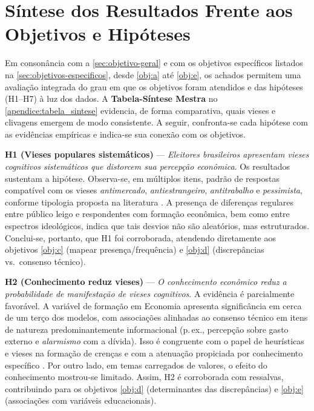\section{Síntese dos Resultados Frente aos Objetivos e Hipóteses}\label{sec:sintese-resultados}

Em consonância com a \autoref{sec:objetivo-geral} e com os objetivos específicos listados na \autoref{sec:objetivos-especificos}, desde \autoref{obj:a} até \autoref{obj:e}, os achados permitem uma avaliação integrada do grau em que os objetivos foram atendidos e das hipóteses (H1–H7) à luz dos dados. A \textbf{Tabela-Síntese Mestra} no \autoref{apendice:tabela_sintese} evidencia, de forma comparativa, quais vieses e clivagens emergem de modo consistente. A seguir, confronta-se cada hipótese com as evidências empíricas e indica-se sua conexão com os objetivos.

\textbf{H1 (Vieses populares sistemáticos)} — \textit{Eleitores brasileiros apresentam vieses cognitivos sistemáticos que distorcem sua percepção econômica}. Os resultados sustentam a hipótese. Observa-se, em múltiplos itens, padrão de respostas compatível com os vieses \emph{antimercado}, \emph{antiestrangeiro}, \emph{antitrabalho} e \emph{pessimista}, conforme tipologia proposta na literatura \cite{The_Myth_of_the_Rational_Voter}. A presença de diferenças regulares entre público leigo e respondentes com formação econômica, bem como entre espectros ideológicos, indica que tais desvios não são aleatórios, mas estruturados. Conclui-se, portanto, que H1 foi corroborada, atendendo diretamente aos objetivos \autoref{obj:c} (mapear presença/frequência) e \autoref{obj:d} (discrepâncias vs.\ consenso técnico).

\textbf{H2 (Conhecimento reduz vieses)} — \textit{O conhecimento econômico reduz a probabilidade de manifestação de vieses cognitivos}. A evidência é parcialmente favorável. A variável de formação em Economia apresenta significância em cerca de um terço dos modelos, com associações alinhadas ao consenso técnico em itens de natureza predominantemente informacional (p.\,ex., percepção sobre gasto externo e \emph{alarmismo} com a dívida). Isso é congruente com o papel de heurísticas e vieses na formação de crenças e com a atenuação propiciada por conhecimento específico \cite{kahneman2011thinking,Judgment_under_Uncertainty, The_Myth_of_the_Rational_Voter}. Por outro lado, em temas carregados de valores, o efeito do conhecimento mostrou-se limitado. Assim, H2 é corroborada com ressalvas, contribuindo para os objetivos \autoref{obj:d} (determinantes das discrepâncias) e \autoref{obj:e} (associações com variáveis educacionais).

